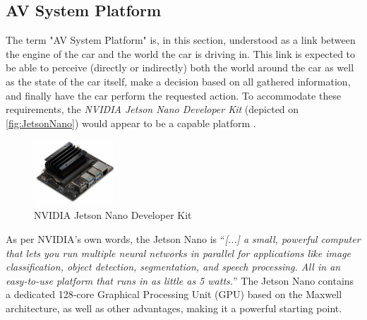 \subsection{AV System Platform}\label{ssec:optimalHardwareAVPlatform}
The term "AV System Platform" is, in this section, understood as a link between the engine of the car and the world the car is driving in.
This link is expected to be able to perceive (directly or indirectly) both the world around the car as well as the state of the car itself, make a decision based on all gathered information, and finally have the car perform the requested action.
To accommodate these requirements, the \textit{NVIDIA Jetson Nano Developer Kit} (depicted on \autoref{fig:JetsonNano}) would appear to be a capable platform \cite{JetsonNano}.
\begin{figure}[H]
  \centering
  \includegraphics[width=3cm]{images/techAnalysis/JetsonNano.jpg}
  \caption{NVIDIA Jetson Nano Developer Kit}
  \label{fig:JetsonNano}
\end{figure}
As per NVIDIA's own words, the Jetson Nano is ``\textit{[...] a small, powerful computer that lets you run multiple neural networks in parallel for applications like image classification, object detection, segmentation, and speech processing.
All in an easy-to-use platform that runs in as little as 5 watts.}''
The Jetson Nano contains a dedicated 128-core Graphical Processing Unit (GPU) based on the Maxwell architecture, as well as other advantages, making it a powerful starting point.
\cite{JetsonNano}

